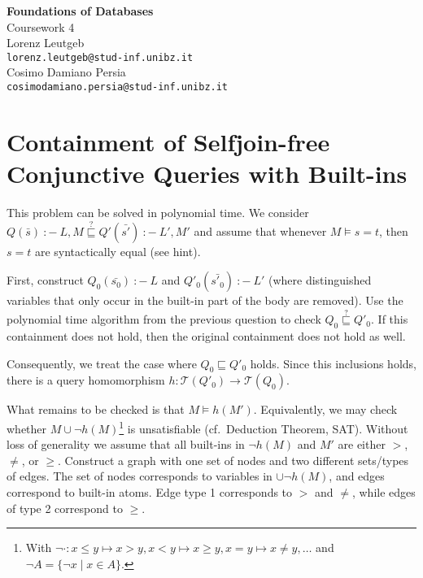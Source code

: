 \documentclass[a4paper,12pt]{article}
\newcommand{\query}[3]{\ensuremath{{#1}({#2})\:{:}{-}\:{#3}}}
\begin{document}
\begin{center}
{\LARGE\bfseries Foundations of Databases}\\[3mm]

{\Large Coursework 4}\\[5mm]

Lorenz Leutgeb\\\texttt{lorenz.leutgeb@stud-inf.unibz.it}\\[2mm]
Cosimo Damiano Persia\\\texttt{cosimodamiano.persia@stud-inf.unibz.it}
\end{center}

\section{Containment of Selfjoin-free Conjunctive Queries with Built-ins}

This problem can be solved in polynomial time. We consider $\query{Q}{\bar{s}}{L, M} \stackrel{?}{\sqsubseteq} \query{Q'}{\bar{s'}}{L', M'}$ and assume that whenever $M \models s = t$, then $s = t$ are syntactically equal (see hint).

First, construct $\query{Q_0}{\bar{s_0}}{L}$ and $\query{Q'_0}{\bar{s'_0}}{L'}$ (where distinguished variables that only occur in the built-in part of the body are removed). Use the polynomial time algorithm from the previous question to check $Q_0 \stackrel{?}{\sqsubseteq} Q'_0$. If this containment does not hold, then the original containment does not hold as well.

Consequently, we treat the case where $Q_0 \sqsubseteq Q'_0$ holds. Since this inclusions holds, there is a query homomorphism $h : \mathcal{T}(Q'_0) \rightarrow \mathcal{T}(Q_0)$. %

What remains to be checked is that $M \models h(M')$. Equivalently, we may check whether $M \cup \neg h(M)$\footnote{With $\neg \cdot : x \leq y \mapsto x > y, x < y \mapsto x \geq y, x = y \mapsto x \neq y, \ldots$ and $\neg A = \{ \neg x \mid x \in A\}$.} is unsatisfiable (cf.\ Deduction Theorem, SAT). Without loss of generality we assume that all built-ins in $\neg h(M)$ and $M'$ are either $>$, $\neq$, or $\geq$. Construct a graph with one set of nodes and two different sets/types of edges. The set of nodes corresponds to variables in $ \cup \neg h(M)$, and edges correspond to built-in atoms. Edge type 1 corresponds to $>$ and $\neq$, while edges of type 2 correspond to $\geq$.
\end{document}

